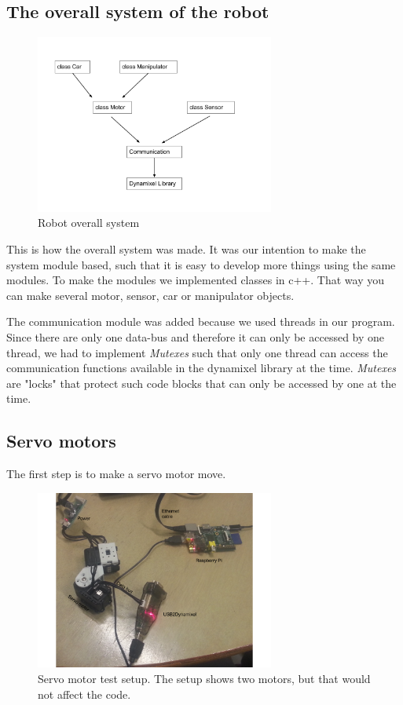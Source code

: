 \subsection{The overall system of the robot}

\begin{figure}[H]
    \centering
    \includegraphics[width=0.7\textwidth]{graphics/Robot_class_diagram.png}	
    \caption{Robot overall system}
    \label{fig:Class_diagram}
\end{figure}

This is how the overall system was made. It was our intention to make the system module based, such that it is easy to develop more things using the same modules. To make the modules we implemented classes in c++. That way you can make several motor, sensor, car or manipulator objects. 

The communication module was added because we used threads in our program. Since there are only one data-bus and therefore it can only be accessed by one thread, we had to implement \textit{Mutexes} such that only one thread can access the communication functions available in the dynamixel library at the time. \textit{Mutexes} are "locks" that protect such code blocks that can only be accessed by one at the time.

\subsection{Servo motors}

The first step is to make a servo motor move. 

\begin{figure}[H]
    \centering
    \includegraphics[width=0.7\textwidth]{graphics/Basic_oppsett.png}
    \caption{Servo motor test setup. The setup shows two motors, but that would not affect the code.}
    \label{fig:servo} 
\end{figure}

